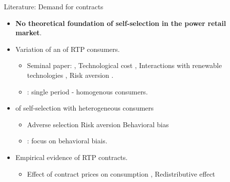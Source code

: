 \documentclass{class}
\begin{document}
\setcounter{totalbeforeappendix}{\value{framenumber}}
\addtocounter{totalbeforeappendix}{2} 
\addtocounter{framenumber}{-9}


\begin{frame}{Literature: Demand for contracts}\label{Lit_Conso}

\begin{itemize}
    \item \textbf{No theoretical foundation of self-selection in the power retail market}.

    \vfill
    
    \item Variation of an  of RTP consumers.
    \begin{itemize}
        \item Seminal paper: \cite{Borenstein2005b}, Technological cost \cite{Leautier2014},  Interactions with renewable technologies \cite{Ambec2021}, Risk aversion \cite{Boom2021}.
        \item {}: single period - homogenous consumers. 
    \end{itemize}

 \vfill

    \item {} of self-selection with heterogeneous consumers
    \begin{itemize}
        \item Adverse selection \cite{Ito2023} Risk aversion \cite{Qiu2018} Behavioral bias \cite{Hortacsu2017,Fowlie2021}
        \item {}: focus on behavioral biais.
    \end{itemize}


\vfill
    \item Empirical evidence of RTP contracts.
    
    \begin{itemize}
        \item Effect of contract prices on consumption \cite{Fabra2021,Han2023,Enrich2024,Fu2024}, Redistributive effect \cite{Leslie2021, Levinson2022a, Cahana2023}
    \end{itemize}


     
    
\end{itemize}

\vfill

\hyperlink{FirstCont}{}

\end{frame}
\end{document}

